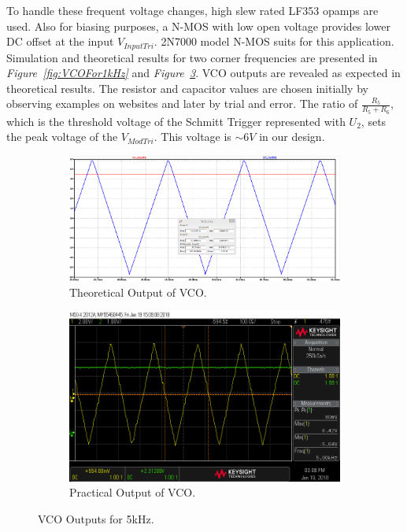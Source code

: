 \documentclass[paper]{IEEEtran}
\begin{document}
To handle these frequent voltage changes, high slew rated LF353\cite{b2} opamps are used. Also for biasing purposes, a N-MOS with low open voltage provides lower DC offset at the input $V_{InputTri}$. 2N7000\cite{b3} model N-MOS suits for this application. Simulation and theoretical results for two corner frequencies are presented in \textit{Figure~\ref{fig:VCOFor1kHz}} and \textit{Figure~\ref{fig:VCOFor5kHz}}. VCO outputs are revealed as expected in theoretical results. The resistor and capacitor values are chosen initially by observing examples on websites\cite{b4} and later by trial and error. The ratio of $\frac{R_{5}}{R_{5}+R_{6}}$, which is the threshold voltage of the Schmitt Trigger represented with $U_{2}$, sets the peak voltage of the $V_{ModTri}$. This voltage is $\sim6V$ in our design.
\begin{figure}[t!]
	\centering
	\begin{subfigure}{.48\textwidth}
		\centering
		\includegraphics[width=1\linewidth]{scope_24_SimResult}
		\caption{Theoretical Output of VCO.}
		\label{fig:VCOFor5kHzTheoretical}
	\end{subfigure}%
	\newline
	\begin{subfigure}{.48\textwidth}
		\centering
		\includegraphics[width=1\linewidth]{scope_24}
		\caption{Practical Output of VCO.}
		\label{fig:VCOFor5kHzPractical}
	\end{subfigure}
	\caption{VCO Outputs for 5kHz.}
	\label{fig:VCOFor5kHz}
\end{figure}
\end{document}
